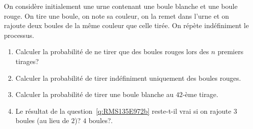 \begin{enonce}
\begin{exercise}[ID={RMS135 E972},subtitle={Mines-Ponts PSI 2024},tags={oraux},difficulty={}]
On considère initialement une urne contenant une boule blanche et une boule rouge.
On tire une boule, on note sa couleur, on la remet dans l'urne et on rajoute deux boules de la même couleur que celle tirée.
On répète indéfiniment le processus.
\begin{enumerate}
  \item Calculer la probabilité de ne tirer que des boules rouges lors des $n$ premiers tirages?

  \item \label{q:RMS135E972b} Calculer la probabilité de tirer indéfiniment uniquement des boules rouges.

  \item Calculer la probabilité de tirer une boule blanche au $42$-ème tirage.

  \item Le résultat de la question~\ref{q:RMS135E972b} reste-t-il vrai si on rajoute $3$ boules (au lieu de $2$)? $4$ boules?.
\end{enumerate}
\end{exercise}
\begin{solution}
\end{solution}
\end{enonce}
